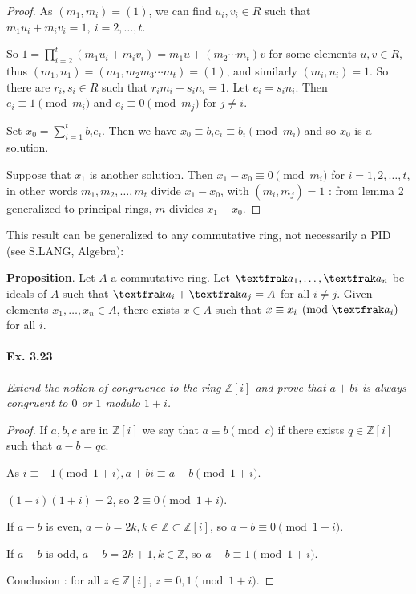 \documentclass[11pt,a4paper]{article}
\newcommand{\Z}{\mathbb{Z}}
\begin{document}
{\begin{proof}
As $(m_1,m_i)=(1)$, we can find $u_i,v_i \in R$ such that $m_1u_i+m_iv_i= 1, \ i=2,\ldots,t$.

So $1 = \prod\limits_{i=2}^t(m_1u_i+m_iv_i ) = m_1 u +(m_2\cdots m_t)v$ for some elements $u,v \in R$, thus $(m_1,n_1) = (m_1,m_2m_3\cdots m_t) = (1)$, and similarly $(m_i,n_i)=1$. So there are $r_i,s_i \in R$ such that $r_im_i+s_in_i = 1$. Let $e_i = s_in_i$. Then $e_i \equiv 1 \pmod{m_i}$ and $e_i \equiv 0 \pmod{m_j}$ for $j\neq i$.

Set $x_0 =\sum_{i=1}^t b_ie_i$. Then we have $x_0 \equiv b_i e_i \equiv b_i \pmod{m_i}$ and so $x_0$ is a solution.

Suppose that $x_1$ is another solution. Then $x_1 -x_0 \equiv 0 \pmod{m_i}$ for $i=1,2,\ldots,t$, in other words $m_1,m_2,\ldots,m_t$ divide $x_1-x_0$, with $(m_i,m_j)=1$ : from lemma 2 generalized to principal rings, $m$ divides $x_1-x_0$.
\end{proof}

\bigskip

This result can be generalized to any commutative ring, not necessarily a PID (see S.LANG, Algebra):

{\bf Proposition}. Let $A$ a commutative ring. Let ${\textfrak a}_1,\ldots, {\textfrak a}_n$ be ideals of $A$ such that ${\textfrak a}_i+{\textfrak a}_j = A$ for all $i\neq j$. Given elements $x_1,\ldots,x_n \in A$, there exists $x\in A$ such that $x\equiv x_i \pmod {{\textfrak a}_i}$ for all $i$.

\paragraph{Ex. 3.23}

{\it Extend the notion of congruence to the ring $\Z[i]$ and prove that $a + bi$ is always congruent to $0$ or $1$ modulo $1 + i$.
}

\begin{proof}
If $a,b,c$ are in $\Z[i]$ we say that $a\equiv b \pmod c$ if there exists $q \in \Z[i]$ such that $a-b = qc$.

As $i\equiv -1 \pmod{1+i}, a+bi \equiv a-b \pmod {1+i}$.

$(1-i)(1+i) = 2$, so $2\equiv 0 \pmod{1+i}$.

If $a-b$ is even, $a-b =2k,k\in \Z \subset \Z[i]$, so $a-b \equiv 0 \pmod{1+i}$.

If $a-b$ is odd, $a-b = 2k+1, k \in \Z$, so $a-b \equiv 1 \pmod {1+i}$.

Conclusion : for all $z \in \Z[i]$, $z\equiv0,1 \pmod{1+i}$.
\end{proof}

}
\end{document}
